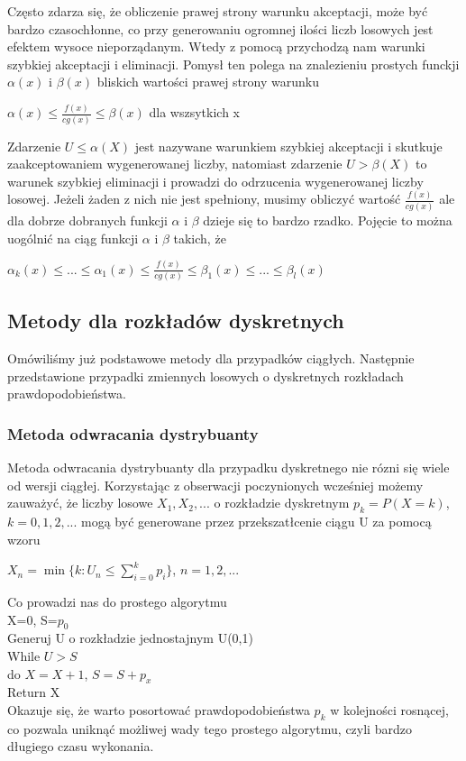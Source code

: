 \documentclass[a4paper]{scrartcl}
\begin{document}
\null\qquad Często zdarza się, że obliczenie prawej strony warunku akceptacji, może być bardzo czasochłonne, co przy generowaniu ogromnej ilości liczb losowych jest efektem wysoce nieporządanym. Wtedy z pomocą przychodzą nam warunki szybkiej akceptacji i eliminacji. Pomysł ten polega na znalezieniu prostych funckji $\alpha(x)$ i $\beta(x)$ bliskich wartości prawej strony warunku
\begin{center}
$\alpha(x) \leq \frac{f(x)}{cg(x)} \leq \beta(x)$ dla wszsytkich x
\end{center}
Zdarzenie $U \leq \alpha(X)$ jest nazywane warunkiem szybkiej akceptacji i skutkuje zaakceptowaniem wygenerowanej liczby, natomiast zdarzenie $U > \beta(X)$ to warunek szybkiej eliminacji i prowadzi do odrzucenia wygenerowanej liczby losowej. Jeżeli żaden z nich nie jest spełniony, musimy obliczyć wartość $\frac{f(x)}{cg(x)}$ ale dla dobrze dobranych funkcji $\alpha$ i $\beta$ dzieje się to bardzo rzadko. Pojęcie to można uogólnić na ciąg funkcji $\alpha$ i $\beta$ takich, że
\begin{center}
$\alpha_k(x) \leq ... \leq \alpha_1(x) \leq \frac{f(x)}{cg(x)} \leq \beta_1(x) \leq ... \leq \beta_l(x)$
\end{center}
\subsection{Metody dla rozkładów dyskretnych}
\qquad Omówiliśmy już podstawowe metody dla przypadków ciągłych. Następnie przedstawione przypadki zmiennych losowych o dyskretnych rozkładach prawdopodobieństwa.
\subsubsection{Metoda odwracania dystrybuanty}
\qquad Metoda odwracania dystrybuanty dla przypadku dyskretnego nie rózni się wiele od wersji ciągłej. Korzystając z obserwacji poczynionych wcześniej możemy zauważyć, że liczby losowe $X_1, X_2, ...$ o rozkładzie dyskretnym $p_k=P(X=k)$, $k=0,1,2,...$ mogą być generowane przez przekszatłcenie ciągu U za pomocą wzoru
\begin{center}
$X_n=\min\{k:U_n \leq \sum_{i=0}^kp_i\}$, $n=1,2,...$
\end{center}
Co prowadzi nas do prostego algorytmu\\
X=0, S=$p_0$\\
Generuj U o rozkładzie jednostajnym U(0,1)\\
\null\qquad While $U>S$\\
\null\qquad\null\qquad do $X=X+1$, $S=S+p_x$\\
Return X\\
Okazuje się, że warto posortować prawdopodobieństwa $p_k$ w kolejności rosnącej, co pozwala uniknąć możliwej wady tego prostego algorytmu, czyli bardzo długiego czasu wykonania.
\end{document}
